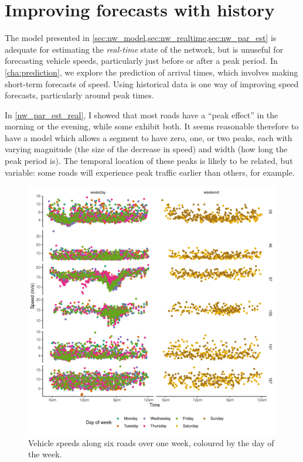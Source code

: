 \section{Improving forecasts with history}
\label{sec:nw_hist_model}

The model presented in \cref{sec:nw_model,sec:nw_realtime,sec:nw_par_est} is adequate for estimating the \emph{real-time} state of the network, but is unuseful for forecasting vehicle speeds, particularly just before or after a peak period. In \cref{cha:prediction}, we explore the prediction of arrival times, which involves making short-term forecasts of speed. Using historical data is one way of improving speed forecasts, particularly around peak times.


In \cref{nw_par_est_real}, I showed that most roads have a ``peak effect'' in the morning or the evening, while some exhibit both. It seems reasonable therefore to have a model which allows a segment to have zero, one, or two peaks, each with varying magnitude (the size of the decrease in speed) and width (how long the peak period is). The temporal location of these peaks is likely to be related, but variable: some roads will experience peak traffic earlier than others, for example.

\begin{knitrout}\small
{}\color{fgcolor}\begin{figure}

{\centering \includegraphics[width=\textwidth]{figure/tt_week0_load-1} 

}

\caption[Vehicle speeds along six roads over one week, coloured by the day of the week]{Vehicle speeds along six roads over one week, coloured by the day of the week.}\label{fig:tt_week0_load}
\end{figure}


\end{knitrout}

